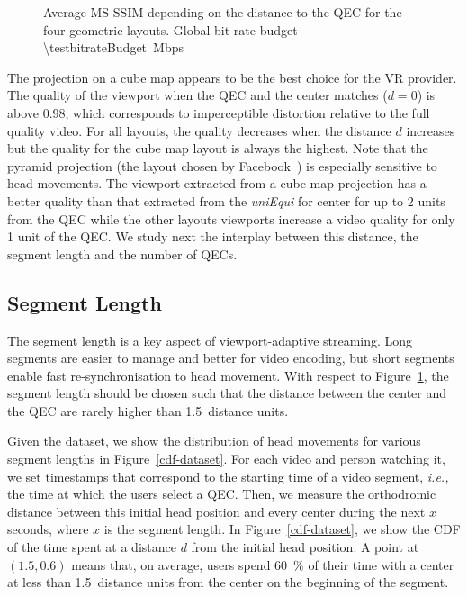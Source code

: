 \begin{figure}
    
       \caption{Average \acs{MS-SSIM} depending on the distance to the \acs{QEC} for the four geometric layouts. Global bit-rate budget \SI{\testbitrateBudget}{\mega bps}}
    \label{fig:dist_quality}
\end{figure}

The projection on a cube map appears to be the best choice for the
\ac{VR} provider. The quality of the viewport when the \ac{QEC} and
the \FoV{} center matches ($d=0$) is above \num{0.98}, which
corresponds to imperceptible distortion relative to the full quality
video. For all layouts, the quality decreases when the distance $d$
increases but the quality for the cube map layout is always the
highest. Note that the pyramid projection (the layout chosen
by Facebook~\cite{facebook}) is especially sensitive to head movements.
The viewport extracted from a cube map projection has a better quality
than that extracted from the \emph{uniEqui} for \FoV{} center for up to
\num{2} units from the \ac{QEC} while the other layouts viewports increase a video quality for only \num{1} unit of the \ac{QEC}.
We study next the interplay between this distance, the segment length and the number of \acp{QEC}.

\subsection{Segment Length}
\label{subsec:segmentLength}

The segment length is a key aspect of viewport-adaptive streaming.
Long segments are easier to manage and better for video encoding, but
short segments enable fast re-synchronisation to head movement. With
respect to Figure~\ref{fig:dist_quality}, the segment length
should be chosen such that the distance between the \FoV{} center and
the \ac{QEC} are rarely higher than \num{1.5}~distance units.

Given the dataset, we show the distribution of head movements for
various segment lengths in Figure~\ref{cdf-dataset}. For each video
and person watching it, we set timestamps that correspond to the
starting time of a video segment, \textit{i.e.,} the time at which the
users select a \ac{QEC}. Then, we measure the orthodromic distance
between this initial head position and every \FoV{} center during
the next $x$ seconds, where $x$ is the segment length. In
Figure~\ref{cdf-dataset}, we show the \ac{CDF} of the time spent at a
distance $d$ from the initial head position.
A point at $(1.5,0.6)$
means that, on average, users spend \SI{60}{\percent} of their time
with a \FoV{} center at less than \num{1.5}~distance units from the
\FoV{} center on the beginning of the segment.

